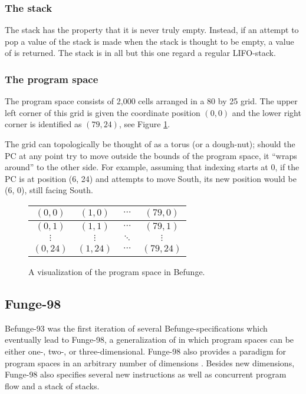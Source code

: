\documentclass[12pt, a4paper]{article}
\begin{document}
\subsubsection{The stack}
\label{sec:stack}

The stack has the property that it is never truly empty. Instead, if an attempt to pop a value of the stack is made when the stack is thought to be empty, a value of  is returned. The stack is in all but this one regard a regular LIFO-stack.

\subsubsection{The program space}
\label{sec:space}

The program space consists of 2,000 cells arranged in a 80 by 25 grid. The upper left corner of this grid is given the coordinate position $(0, 0)$ and the lower right corner is identified as $(79, 24)$, see Figure \ref{fig:grid}.

The grid can topologically be thought of as a torus (or a dough-nut); should the PC at any point try to move outside the bounds of the program space, it “wraps around” to the other side. For example, assuming that indexing starts at 0, if the PC is at position (6, 24) and attempts to move South, its new position would be (6, 0), still facing South.

\begin{figure}[!ht]
\centering
\begin{tabular}{|c|c|c|c|}
\hline
$(0, 0)$ & $(1, 0)$ & $\cdots$ & $(79, 0)$\\
\hline
$(0, 1)$ & $(1, 1)$ & $\cdots$ & $(79, 1)$\\
\hline
$\vdots$ & $\vdots$ & $\ddots$ & $\vdots$\\
\hline
$(0, 24)$ & $(1, 24)$ & $\cdots$ & $(79, 24)$\\
\hline
\end{tabular}
\caption{A visualization of the program space in Befunge.}
\label{fig:grid}
\end{figure}

\subsection{Funge-98}
\label{sec:funge98}

Befunge-93 was the first iteration of several Befunge-specifications which eventually lead to Funge-98, a generalization of in which program spaces can be either one-, two-, or three-dimensional. Funge-98 also provides a paradigm for program spaces in an arbitrary number of dimensions \cite{funge98}. Besides new dimensions, Funge-98 also specifies several new instructions as well as concurrent program flow and a stack of stacks.
\end{document}
